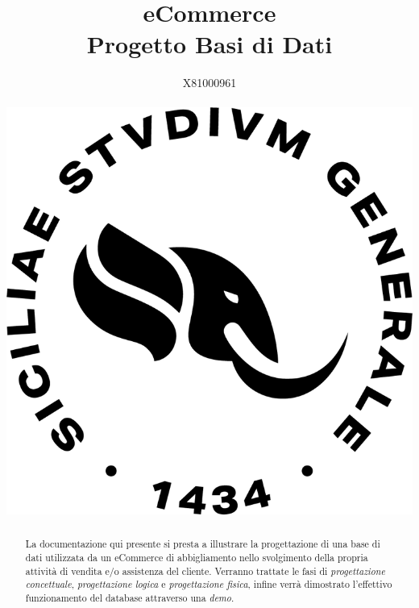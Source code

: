 \documentclass{article}
\title{eCommerce\\ \small{Progetto Basi di Dati}}
\date{}
\author{X81000961\\\\\includegraphics[scale=0.2]{images/unict-logo.png}}
\begin{document}
\maketitle

\begin{abstract}
La documentazione qui presente si presta a illustrare la progettazione di una base di dati utilizzata da un eCommerce di abbigliamento nello svolgimento della propria attività di vendita e/o assistenza del cliente. Verranno trattate le fasi di \textit{progettazione concettuale}, \textit{progettazione logica} e \textit{progettazione fisica}, infine verrà dimostrato l'effettivo funzionamento del database attraverso una \textit{demo}.
\end{abstract}
\newpage

\tableofcontents

\newpage



\end{document}
